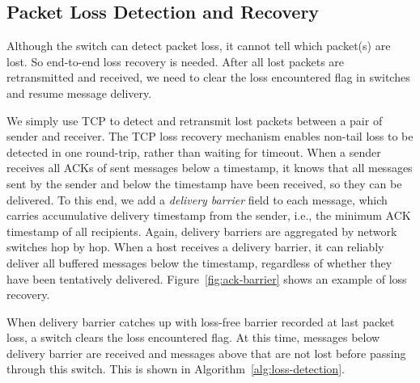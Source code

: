 {%


\subsection{Packet Loss Detection and Recovery}
\label{sec:lossy}

Although the switch can detect packet loss, it cannot tell which packet(s) are lost.
So end-to-end loss recovery is needed.
After all lost packets are retransmitted and received, we need to clear the loss encountered flag in switches and resume message delivery.

We simply use TCP to detect and retransmit lost packets between a pair of sender and receiver.
The TCP loss recovery mechanism enables non-tail loss to be detected in one round-trip, rather than waiting for timeout.
When a sender receives all ACKs of sent messages below a timestamp, it knows that all messages sent by the sender and below the timestamp have been received, so they can be delivered.
To this end, we add a \emph{delivery barrier} field to each message, which carries accumulative delivery timestamp from the sender, i.e., the minimum ACK timestamp of all recipients.
Again, delivery barriers are aggregated by network switches hop by hop.
When a host receives a delivery barrier, it can reliably deliver all buffered messages below the timestamp, regardless of whether they have been tentatively delivered.
Figure~\ref{fig:ack-barrier} shows an example of loss recovery.

When delivery barrier catches up with loss-free barrier recorded at last packet loss, a switch clears the loss encountered flag.
At this time, messages below delivery barrier are received and messages above that are not lost before passing through this switch.
This is shown in Algorithm~\ref{alg:loss-detection}.

}
